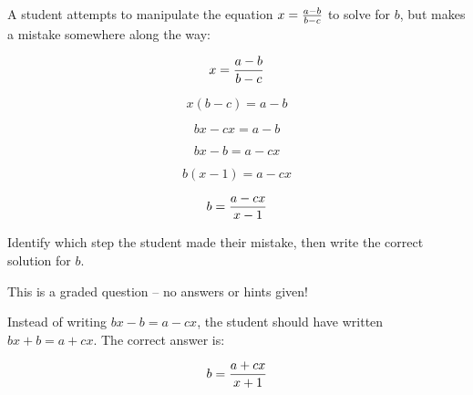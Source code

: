 

A student attempts to manipulate the equation $x = {{a-b} \over {b-c}}$ to solve for $b$, but makes a mistake somewhere along the way:

\vskip 10pt

$$x = {{a-b} \over {b-c}}$$

\vskip 10pt

$$x(b - c) = a - b$$

\vskip 10pt

$$bx - cx = a - b$$

\vskip 10pt

$$bx - b = a - cx$$

\vskip 10pt

$$b(x - 1) = a - cx$$

\vskip 10pt

$$b = {{a - cx} \over {x - 1}}$$

\vskip 10pt

Identify which step the student made their mistake, then write the correct solution for $b$.

\vfil 

\eject






This is a graded question -- no answers or hints given!








Instead of writing $bx - b = a - cx$, the student should have written $bx + b = a + cx$.  The correct answer is:

$$b = {{a + cx} \over {x + 1}}$$




